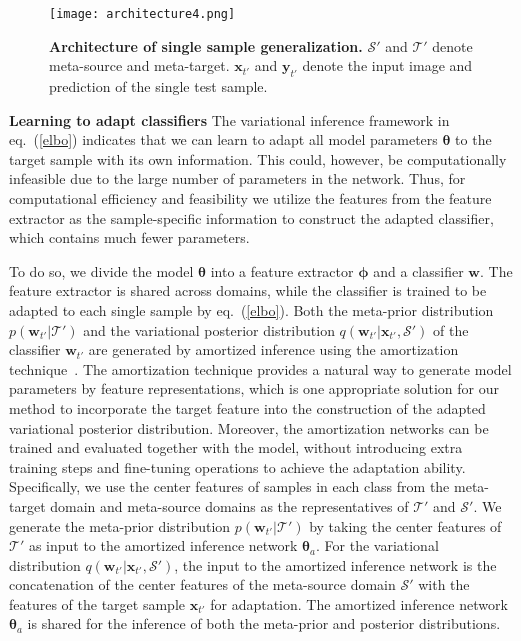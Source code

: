 \documentclass{article} \usepackage[table]{xcolor}
\newcommand{\x}{\mathbf{x}}
\newcommand{\y}{\mathbf{y}}
\newcommand{\w}{\mathbf{w}}
\newcommand{\btheta}{\boldsymbol{\theta}}
\newcommand{\bphi}{\boldsymbol{\phi}}
\begin{document}
\begin{wrapfigure}{r}{0.6\textwidth}
\vspace{-4.5mm}
\centering 
\centerline{
\texttt{[image: architecture4.png]}
} 
\vspace{-4mm}
\caption{\textbf{Architecture of single sample generalization.} $\mathcal{S'}$ and $\mathcal{T'}$ denote  meta-source and meta-target. $\x_{t'}$ and $\y_{t'}$ denote the input image and prediction of the single test sample. 
}
\label{model}
\vspace{-6mm}
\end{wrapfigure}

\vspace{-0.5mm}
\textbf{Learning to adapt classifiers}
The variational inference framework in eq.~(\ref{elbo}) indicates that we can learn to adapt all model parameters $\btheta$ to the target sample with its own information. 
This could, however, be computationally infeasible due to the large number of parameters in the network.
Thus, for computational efficiency and feasibility we utilize the features from the feature extractor as the sample-specific information to construct the adapted classifier, which contains much fewer parameters.


To do so, we divide the model $\btheta$ into a feature extractor $\bphi$ and a classifier $\w$. The feature extractor is shared across domains, while the classifier is trained to be adapted to each single sample by eq.~(\ref{elbo}). 
Both the meta-prior distribution $p(\w_{t'}|\mathcal{T'})$ and the variational posterior distribution $q(\w_{t'}|\x_{t'}, \mathcal{S'})$ of the classifier $\w_{t'}$ are generated by amortized inference using the amortization technique~\citep{kingma2013auto, gershman2014amortized,gordon2018meta, shen2021variational}.
The amortization technique provides a natural way to generate model parameters by feature representations, which is one appropriate solution for our method to incorporate the target feature into the construction of the adapted variational posterior distribution. Moreover, the amortization networks can be trained and evaluated together with the model, without introducing extra training steps and fine-tuning operations to achieve the adaptation ability.
Specifically, we use the center features of samples in each class from the meta-target domain and meta-source domains as the representatives of $\mathcal{T'}$ and $\mathcal{S'}$. 
We generate the meta-prior distribution $p(\w_{t'}|\mathcal{T'})$ by taking the center features of $\mathcal{T'}$ as input to the amortized inference network $\btheta_{a}$. For the variational distribution $q(\w_{t'}|\x_{t'}, \mathcal{S'})$, the input to the amortized inference network is the concatenation of the center features of the meta-source domain $\mathcal{S'}$ with the features of the target sample $\x_{t'}$ for adaptation. 
The amortized inference network $\btheta_{a}$ is shared for the inference of both the meta-prior and posterior distributions.
\end{document}
